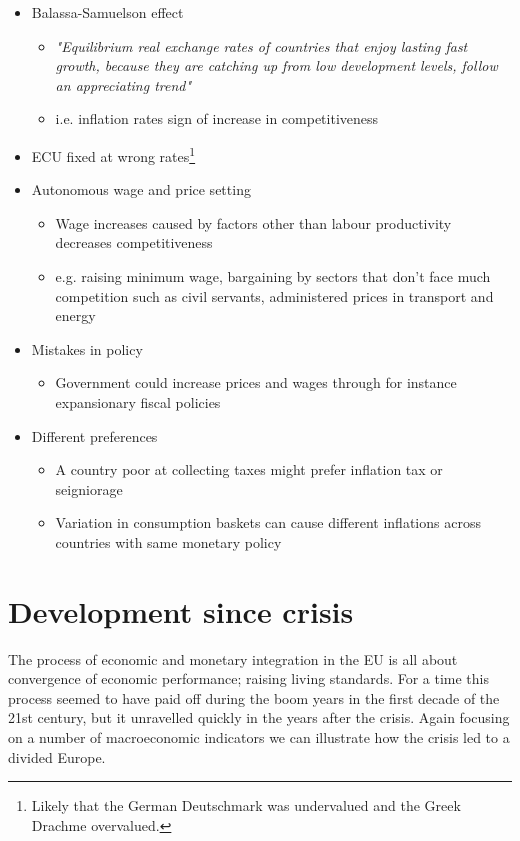 \documentclass{tufte-handout}
\begin{document}
\begin{itemize}
  \item Balassa-Samuelson effect
  \begin{itemize}
    \item \textit{"Equilibrium real exchange rates of countries that enjoy lasting fast growth, because they are catching up from low development levels, follow an appreciating trend"}
    \item i.e. inflation rates sign of increase in competitiveness 
  \end{itemize}
  \item ECU fixed at wrong rates\footnote{Likely that the German Deutschmark was undervalued and the Greek Drachme overvalued.}
  \item Autonomous wage and price setting
  \begin{itemize}
    \item Wage increases caused by factors other than labour productivity decreases competitiveness
    \item e.g. raising minimum wage, bargaining by sectors that don't face much competition such as civil servants, administered prices in transport and energy
  \end{itemize}
  \item Mistakes in policy
  \begin{itemize}
    \item Government could increase prices and wages through for instance expansionary fiscal policies
  \end{itemize}  
  \item Different preferences
  \begin{itemize}
    \item A country poor at collecting taxes might prefer inflation tax or seigniorage
    \item Variation in consumption baskets can cause different inflations across countries with same monetary policy
  \end{itemize}
\end{itemize}
\clearpage

\section{Development since crisis}
The process of economic and monetary integration in the EU is all about convergence of economic performance; raising living standards. 
For a time this process seemed to have paid off during the boom years in the first decade of the 21st century, but it unravelled quickly in the years after the crisis. 
Again focusing on a number of macroeconomic indicators we can illustrate how the crisis led to a divided Europe. 
\end{document}
